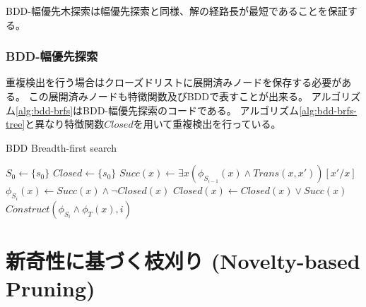 BDD-幅優先木探索は幅優先探索と同様、解の経路長が最短であることを保証する。


\subsubsection{BDD-幅優先探索}

重複検出を行う場合はクローズドリストに展開済みノードを保存する必要がある。
この展開済みノードも特徴関数及びBDDで表すことが出来る。
アルゴリズム\ref{alg:bdd-brfs}はBDD-幅優先探索のコードである。
アルゴリズム\ref{alg:bdd-brfs-tree}と異なり特徴関数$Closed$を用いて重複検出を行っている。

\begin{algorithm}
\caption{BDD Breadth-first search}
\label{alg:bdd-brfs}
	$S_0 \leftarrow \{s_0\}$\;
	$Closed \leftarrow \{s_0\}$\;
	 {
		$Succ(x) \leftarrow \exists x (\phi_{S_{i-1}}(x) \land Trans(x,x'))[x'/x]$\;
		$\phi_{S_i}(x) \leftarrow Succ(x) \land \lnot Closed(x)$\;
		$Closed(x) \leftarrow Closed(x) \lor Succ(x)$\;
		 {
			\Return $Construct(\phi_{S_i} \land \phi_T(x), i)$\;
		}
	}
\end{algorithm}







\section{新奇性に基づく枝刈り (Novelty-based Pruning)}
\label{sec:novelty-based-pruning}

